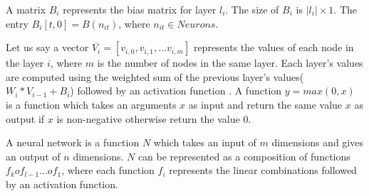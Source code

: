 \begin{df}
    A matrix $B_i$ represents the bias matrix for layer $l_i$. The size of $B_i$ is $|l_i|\times 1$. 
    The entry $B_i[t,0] = B(n_{it})$, where $n_{it} \in Neurons$. 
\end{df}


Let us say a vector $\overline{V_i} = [v_{i,0}, v_{i,1}, ... v_{i,m}]$ represents the values of each node 
in the layer $i$, where $m$ is the number of nodes in the same layer. 
Each layer's values are computed using the weighted sum of the previous layer's values($W_i * V_{i-1} + B_i$) 
followed by an activation function \relu{}. A function $y = max(0,x)$ is a \relu{} function which 
takes an arguments $x$ as input and return the same value $x$ as output if $x$ is non-negative otherwise 
return the value 0. 

A neural network is a function $N$ which takes an input of $m$ dimensions and gives an output of $n$ dimensions.
$N$ can be represented as a composition of functions $f_k o f_{l-1} ... o f_1$, where each function $f_i$ 
represents the linear combinations followed by an activation function. 


